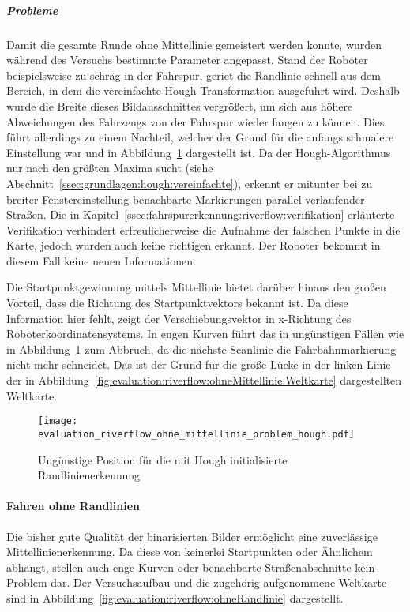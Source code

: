 \subparagraph{Probleme}
Damit die gesamte Runde ohne Mittellinie gemeistert werden konnte, wurden während des Versuchs bestimmte Parameter angepasst. Stand der Roboter beispielsweise zu schräg in der Fahrspur, geriet die Randlinie schnell aus dem Bereich, in dem die vereinfachte Hough-Transformation ausgeführt wird. Deshalb wurde die Breite dieses Bildausschnittes vergrößert, um sich aus höhere Abweichungen des Fahrzeugs von der Fahrspur wieder fangen zu können. Dies führt allerdings zu einem Nachteil, welcher der Grund für die anfangs schmalere Einstellung war und in Abbildung~\ref{fig:evaluation:riverflow:ohneMittellinie:problem} dargestellt ist. Da der Hough-Algorithmus nur nach den größten Maxima sucht (siehe Abschnitt~\ref{ssec:grundlagen:hough:vereinfachte}), erkennt er mitunter bei zu breiter Fenstereinstellung benachbarte Markierungen parallel verlaufender Straßen. Die in Kapitel~\ref{ssec:fahrspurerkennung:riverflow:verifikation} erläuterte Verifikation verhindert erfreulicherweise die Aufnahme der falschen Punkte in die Karte, jedoch wurden auch keine richtigen erkannt. Der Roboter bekommt in diesem Fall keine neuen Informationen. 

Die Startpunktgewinnung mittels Mittellinie bietet darüber hinaus den großen Vorteil, dass die Richtung des Startpunktvektors bekannt ist. Da diese Information hier fehlt, zeigt der Verschiebungsvektor in x-Richtung des Roboterkoordinatensystems. In engen Kurven führt das in ungünstigen Fällen wie in Abbildung~\ref{fig:evaluation:riverflow:ohneMittellinie:problem} zum Abbruch, da die nächste Scanlinie die Fahrbahnmarkierung nicht mehr schneidet. Das ist der Grund für die große Lücke in der linken Linie der in Abbildung~\ref{fig:evaluation:riverflow:ohneMittellinie:Weltkarte} dargestellten Weltkarte. 

\begin{figure}[htbp] %
	\centering
	\texttt{[image: evaluation\_riverflow\_ohne\_mittellinie\_problem\_hough.pdf]}
	\label{fig:evaluation:riverflow:ohneMittellinie:problem}
	\caption{Ungünstige Position für die mit Hough initialisierte Randlinienerkennung}
\end{figure}

\paragraph{Fahren ohne Randlinien}
Die bisher gute Qualität der binarisierten Bilder ermöglicht eine zuverlässige Mittellinienerkennung. Da diese von keinerlei Startpunkten oder Ähnlichem abhängt, stellen auch enge Kurven oder benachbarte Straßenabschnitte kein Problem dar. Der Versuchsaufbau und die zugehörig aufgenommene Weltkarte sind in Abbildung~\ref{fig:evaluation:riverflow:ohneRandlinie} dargestellt.


